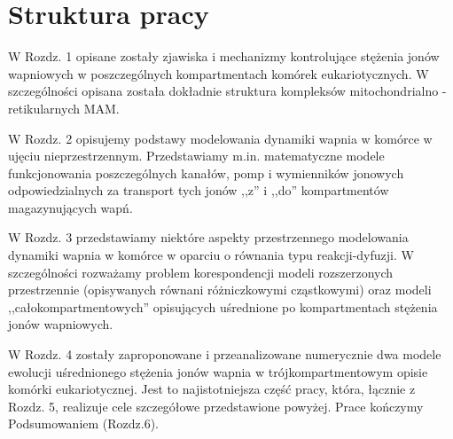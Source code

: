 \chapter{Struktura pracy}
\label{chap:struktura}
\bigskip

W  Rozdz. 1 opisane zostały  zjawiska i mechanizmy kontrolujące stężenia jonów wapniowych w poszczególnych kompartmentach komórek eukariotycznych. W szczególności opisana została  dokładnie struktura kompleksów mitochondrialno - retikularnych MAM. 

\bigskip

W Rozdz. 2 opisujemy  podstawy modelowania dynamiki wapnia w komórce w ujęciu nieprzestrzennym. Przedstawiamy m.in. matematyczne modele funkcjonowania poszczególnych kanałów, pomp i wymienników jonowych odpowiedzialnych za transport tych jonów ,,z'' i ,,do'' kompartmentów magazynujących wapń.  

\bigskip

W Rozdz. 3  przedstawiamy niektóre aspekty przestrzennego modelowania dynamiki wapnia w komórce w oparciu o równania typu reakcji-dyfuzji. W szczególności rozważamy problem korespondencji modeli rozszerzonych przestrzennie (opisywanych równani różniczkowymi cząstkowymi) oraz modeli ,,całokompartmentowych'' opisujących uśrednione po kompartmentach stężenia jonów wapniowych.  

\bigskip

W Rozdz. 4  zostały zaproponowane i przeanalizowane numerycznie dwa modele ewolucji uśrednionego stężenia jonów wapnia w trójkompartmentowym opisie komórki eukariotycznej. Jest to najistotniejsza część pracy, która, łącznie z Rozdz. 5, realizuje cele szczegółowe przedstawione powyżej. Prace kończymy Podsumowaniem (Rozdz.6).